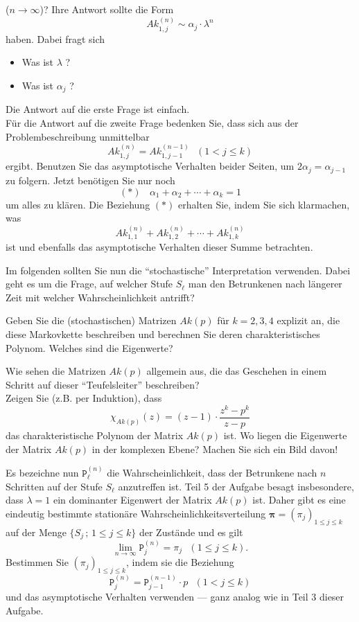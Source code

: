 \begin{flushenum}
	($n \rightarrow \infty$)? Ihre Antwort sollte die Form
	\[
	Ak_{1,j}^{(n)} \sim  \alpha_j \cdot \lambda^n
	\]
	haben. Dabei fragt sich
	\begin{itemize}
	\item Was ist $\lambda$ ? 
	\item Was ist $\alpha_j$ ?
	\end{itemize}
	Die Antwort auf die erste Frage ist einfach. \\
	Für die Antwort auf die zweite Frage bedenken Sie, dass sich aus der
	Problembeschreibung unmittelbar
	\[
	Ak_{1,j}^{(n)} = Ak_{1,j-1}^{(n-1)} ~~~(1<j\leq k)
	\]
	ergibt. Benutzen Sie das asymptotische Verhalten beider Seiten, um $2
	\alpha_j= \alpha_{j-1}$ zu folgern.  Jetzt benötigen Sie nur noch
	\[
	(*)~~~~\alpha_1+\alpha_2 + \cdots + \alpha_k=1
	\]
	um alles zu klären. Die Beziehung $(*)$ erhalten Sie, indem Sie sich
	klarmachen, was
	\[
	Ak_{1,1}^{(n)} + Ak_{1,2}^{(n)} + \cdots + Ak_{1,k}^{(n)} 
	\]
	ist und ebenfalls das asymptotische Verhalten dieser Summe betrachten.
\end{flushenum}

Im folgenden sollten Sie nun die ``stochastische'' Interpretation verwenden.
Dabei geht es um die Frage, auf welcher Stufe $S_\ell$ man den Betrunkenen nach
längerer Zeit mit welcher Wahrscheinlichkeit antrifft?

\begin{flushenum}
\setcounter{itemcounter}{3}
\item Geben Sie die (stochastischen) Matrizen $Ak(p)$ für $k=2,3,4$ explizit
	an, die diese Markovkette beschreiben und berechnen Sie deren
	charakteristisches Polynom.  Welches sind die Eigenwerte?
\item Wie sehen die Matrizen $Ak(p)$ allgemein aus, die das Geschehen in einem
	Schritt auf dieser ``Teufelsleiter''  beschreiben?\\ Zeigen Sie (z.B.
	per Induktion), dass
	\[
	\chi_{Ak(p)}(z) = (z-1) \cdot \frac{z^k-p^k}{z-p}
	\]
	das charakteristische Polynom der Matrix $Ak(p)$ ist.  Wo liegen die
	Eigenwerte der Matrix $Ak(p)$ in der komplexen Ebene?  Machen Sie sich
	ein Bild davon!

\item Es bezeichne nun $\mathtt{P}_\ell^{(n)}$ die Wahrscheinlichkeit, dass der
	Betrunkene nach $n$ Schritten auf der Stufe $S_\ell$ anzutreffen ist.
	Teil 5 der Aufgabe besagt insbesondere, dass $\lambda=1$ ein dominanter
	Eigenwert der Matrix $Ak(p)$ ist.
	Daher gibt es eine eindeutig bestimmte stationäre
	Wahrscheinlichkeitsverteilung $\boldsymbol{\pi}=(\pi_j)_{1 \leq j \leq
	k}$ auf der Menge $\{S_j\,;\, 1 \leq j \leq k\}$  der Zustände und es
	gilt
	\[
	\lim_{n \rightarrow \infty} \mathtt{P}_j^{(n)} = \pi_j ~~~(1 \leq j \leq k).
	\]
	Bestimmen Sie $(\pi_j)_{1 \leq j \leq k}$, indem sie die Beziehung
	\[
	\mathtt{P}_j^{(n)} = \mathtt{P}_{j-1}^{(n-1)} \cdot p~~~(1<j\leq k)
	\]
	und das asymptotische Verhalten verwenden --- ganz analog wie in Teil 3
	dieser Aufgabe.
\end{flushenum}

